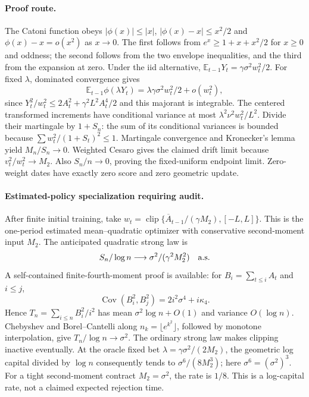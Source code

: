 \paragraph{Proof route.}
The Catoni function obeys $|\phi(x)|\le|x|$,
$|\phi(x)-x|\le x^2/2$ and $\phi(x)-x=o(x^2)$ as $x\to0$.
The first follows from $e^x\ge1+x+x^2/2$ for $x\ge0$ and oddness;
the second follows from the two envelope inequalities, and the third from
the expansion at zero. Under the iid alternative,
$\mathbb E_{t-1}Y_t=\gamma\sigma^2w_t^2/2$.
For fixed $\lambda$, dominated convergence gives
\[
 \mathbb E_{t-1}\phi(\lambda Y_t)
   =\lambda\gamma\sigma^2w_t^2/2+o(w_t^2),
\]
since $Y_t^2/w_t^2\le2A_t^2+\gamma^2L^2 A_t^4/2$ and this majorant is
integrable. The centered transformed increments have conditional variance
at most $\lambda^2\nu^2 w_t^2/L^2$. Divide their martingale by $1+S_n$:
the sum of its conditional variances is bounded because
$\sum w_t^2/(1+S_t)^2\le1$. Martingale convergence and Kronecker's lemma
yield $M_n/S_n\to0$. Weighted Cesaro gives the claimed drift limit because
$v_t^2/w_t^2\to M_2$. Also $S_n/n\to0$, proving the fixed-uniform endpoint
limit. Zero-weight dates have exactly zero score and zero geometric update.

\paragraph{Estimated-policy specialization requiring audit.}
After finite initial training, take
$w_t=\operatorname{clip}\{\overline A_{t-1}/(\gamma M_2),[-L,L]\}$.
This is the one-period estimated mean--quadratic optimizer with conservative
second-moment input $M_2$. The anticipated quadratic strong law is
\[
 S_n/\log n\longrightarrow\sigma^2/(\gamma^2M_2^2)\quad\hbox{a.s.}
\]
A self-contained finite-fourth-moment proof is available: for
$B_i=\sum_{t\le i}A_t$ and $i\le j$,
\[
 \operatorname{Cov}(B_i^2,B_j^2)=2i^2\sigma^4+i\kappa_4.
\]
Hence $T_n=\sum_{i\le n}B_i^2/i^2$ has mean $\sigma^2\log n+O(1)$ and
variance $O(\log n)$. Chebyshev and Borel--Cantelli along
$n_k=\lfloor e^{k^2}\rfloor$, followed by monotone interpolation, give
$T_n/\log n\to\sigma^2$. The ordinary strong law makes clipping inactive
eventually. At the oracle fixed bet $\lambda=\gamma\sigma^2/(2M_2)$, the
geometric log capital divided by $\log n$ consequently tends to
$\sigma^6/(8M_2^3)$; here $\sigma^6=(\sigma^2)^3$.
For a tight second-moment contract $M_2=\sigma^2$, the rate is $1/8$.
This is a log-capital rate, not a claimed expected rejection time.

